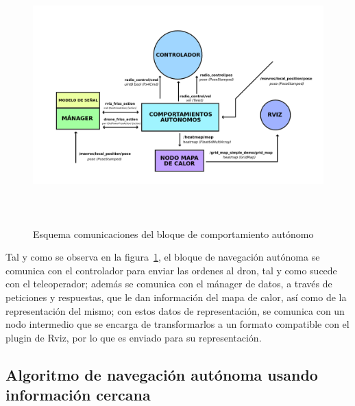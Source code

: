 \begin{figure} [t]
    \begin{center}
    \includegraphics[height=10cm]{imagenes/cap4/5_esquema_comp_auto.png}
    \end{center}
	\caption[Esquema comunicaciones del bloque de comportamiento autónomo]{Esquema comunicaciones del bloque de comportamiento autónomo}
	\label{fig:esquema_auto}
\end{figure}


Tal y como se observa en la figura~\ref{fig:esquema_auto}, el bloque de navegación autónoma se comunica con el controlador para enviar las ordenes al dron, tal y como sucede con el teleoperador; además se comunica con el mánager de datos, a través de peticiones y respuestas, que le dan información del mapa de calor, así como de la representación del mismo; con estos datos de representación, se comunica con un nodo intermedio que se encarga de transformarlos a un formato compatible con el plugin de Rviz, por lo que es enviado para su representación.

\subsection{Algoritmo de navegación autónoma usando información cercana}
\label{subsec:algoritmo_sf}

